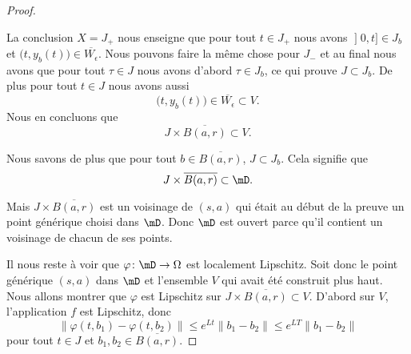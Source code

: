 \begin{proof}
\begin{subproof}
	\end{subproof}

	La conclusion \( X=J_+\) nous enseigne que pour tout \( t\in J_+\) nous avons \( \mathopen] 0 , t \mathclose]\in J_b\) et \( \big( t,y_b(t) \big)\in \overline{ W_{\epsilon} }\). Nous pouvons faire la même chose pour \( J_-\) et au final nous avons que pour tout \( \tau\in J\) nous avons d'abord \( \tau\in J_b\), ce qui prouve \( J\subset J_b\). De plus pour tout \( t\in J\) nous avons aussi
	\begin{equation}
		\big( t,y_b(t) \big)\in\overline{ W_{\epsilon} }\subset V.
	\end{equation}
	Nous en concluons que
	\begin{equation}
		J\times \overline{ B(a,r) }\subset V.
	\end{equation}

	Nous savons de plus que pour tout \( b\in \overline{ B(a,r) }\), \( J\subset J_b\). Cela signifie que
	\begin{equation}
		J\times \overline{ B(a,r) }\subset \mD.
	\end{equation}

	Mais \( J\times \overline{ B(a,r) }\) est un voisinage de \( (s,a)\) qui était au début de la preuve un point générique choisi dans \( \mD\). Donc \( \mD\) est ouvert parce qu'il contient un voisinage de chacun de ses points.

	Il nous reste à voir que \( \varphi\colon \mD\to \Omega\) est localement Lipschitz. Soit donc le point générique \( (s,a)\) dans \( \mD\) et l'ensemble \( V\) qui avait été construit plus haut. Nous allons montrer que \( \varphi\) est Lipschitz sur \( J\times \overline{ B(a,r) }\subset V\). D'abord sur \( V\), l'application \( f\) est Lipschitz, donc
	\begin{equation}
		\| \varphi(t,b_1)-\varphi(t,b_2) \|\leq  e^{Lt}\| b_1-b_2 \|
		\leq  e^{LT}\| b_1-b_2 \|
	\end{equation}
	pour tout \( t\in J\) et \( b_1,b_2\in \overline{ B(a,r) }\).


\end{proof}
